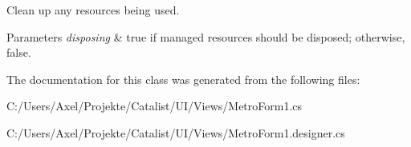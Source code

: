 Clean up any resources being used. 


\begin{DoxyParams}{Parameters}
{\em disposing} & true if managed resources should be disposed; otherwise, false.\\
\hline
\end{DoxyParams}


The documentation for this class was generated from the following files\+:\begin{DoxyCompactItemize}
\item 
C\+:/\+Users/\+Axel/\+Projekte/\+Catalist/\+U\+I/\+Views/Metro\+Form1.\+cs\item 
C\+:/\+Users/\+Axel/\+Projekte/\+Catalist/\+U\+I/\+Views/Metro\+Form1.\+designer.\+cs\end{DoxyCompactItemize}
